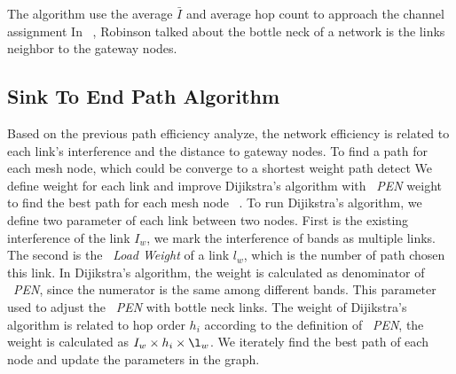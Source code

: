 The algorithm use the average $\bar{I}$ and average hop count to approach the channel assignment
In ~\cite{robinson2008adding}, Robinson talked about the bottle neck of a network is the links neighbor to the gateway nodes.





\subsection{Sink To End Path Algorithm}
\label{subsec:step}

Based on the previous path efficiency analyze, the network efficiency is related to each link's interference and the distance to gateway nodes. To find a path for each mesh node, which could be converge to a shortest weight path detect
We define weight for each link and improve Dijikstra's algorithm with ~\emph{PEN} weight to find the best path for each mesh node ~\cite{golden1976shortest}.
To run Dijikstra's algorithm, we define two parameter of each link between two nodes. First is the existing interference of the link $I_w$, we mark the interference of bands as multiple links. 
The second is the ~\emph{Load Weight} of a link $l_w$, which is the number of path chosen this link. In Dijikstra's algorithm, the weight is calculated as denominator of ~\emph{PEN}, since the numerator is the same among different bands.
This parameter used to adjust the ~\emph{PEN} with bottle neck links.
The weight of Dijikstra's algorithm is related to hop order $h_i$ according to the definition of ~\emph{PEN}, the weight is calculated as $I_w\times h_i \times \l_w$.
We iterately find the best path of each node and update the parameters in the graph.





